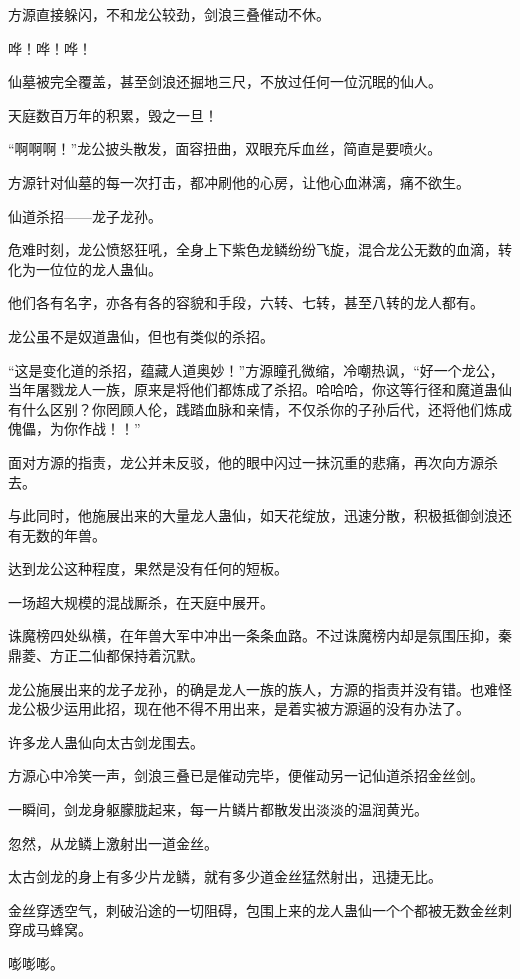 \begin{this_body}
方源直接躲闪，不和龙公较劲，剑浪三叠催动不休。

哗！哗！哗！

仙墓被完全覆盖，甚至剑浪还掘地三尺，不放过任何一位沉眠的仙人。

天庭数百万年的积累，毁之一旦！

“啊啊啊！”龙公披头散发，面容扭曲，双眼充斥血丝，简直是要喷火。

方源针对仙墓的每一次打击，都冲刷他的心房，让他心血淋漓，痛不欲生。

仙道杀招——龙子龙孙。

危难时刻，龙公愤怒狂吼，全身上下紫色龙鳞纷纷飞旋，混合龙公无数的血滴，转化为一位位的龙人蛊仙。

他们各有名字，亦各有各的容貌和手段，六转、七转，甚至八转的龙人都有。

龙公虽不是奴道蛊仙，但也有类似的杀招。

“这是变化道的杀招，蕴藏人道奥妙！”方源瞳孔微缩，冷嘲热讽，“好一个龙公，当年屠戮龙人一族，原来是将他们都炼成了杀招。哈哈哈，你这等行径和魔道蛊仙有什么区别？你罔顾人伦，践踏血脉和亲情，不仅杀你的子孙后代，还将他们炼成傀儡，为你作战！！”

面对方源的指责，龙公并未反驳，他的眼中闪过一抹沉重的悲痛，再次向方源杀去。

与此同时，他施展出来的大量龙人蛊仙，如天花绽放，迅速分散，积极抵御剑浪还有无数的年兽。

达到龙公这种程度，果然是没有任何的短板。

一场超大规模的混战厮杀，在天庭中展开。

诛魔榜四处纵横，在年兽大军中冲出一条条血路。不过诛魔榜内却是氛围压抑，秦鼎菱、方正二仙都保持着沉默。

龙公施展出来的龙子龙孙，的确是龙人一族的族人，方源的指责并没有错。也难怪龙公极少运用此招，现在他不得不用出来，是着实被方源逼的没有办法了。

许多龙人蛊仙向太古剑龙围去。

方源心中冷笑一声，剑浪三叠已是催动完毕，便催动另一记仙道杀招金丝剑。

一瞬间，剑龙身躯朦胧起来，每一片鳞片都散发出淡淡的温润黄光。

忽然，从龙鳞上激射出一道金丝。

太古剑龙的身上有多少片龙鳞，就有多少道金丝猛然射出，迅捷无比。

金丝穿透空气，刺破沿途的一切阻碍，包围上来的龙人蛊仙一个个都被无数金丝刺穿成马蜂窝。

嘭嘭嘭。


\end{this_body}
